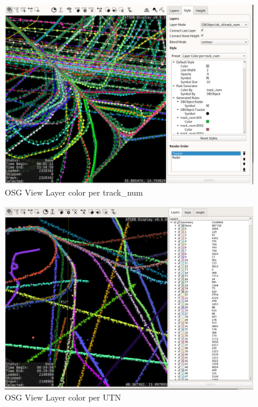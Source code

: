\begin{figure}[H]
    \hspace*{-2.5cm}
    \includegraphics[width=19cm,frame]{../screenshots/osgview_style_track_num.png}
  \caption{OSG View Layer color per track\_num}
\end{figure}

\begin{figure}[H]
    \hspace*{-2.5cm}
    \includegraphics[width=19cm,frame]{../screenshots/osgview_style_utn.png}
  \caption{OSG View Layer color per UTN}
\end{figure}

